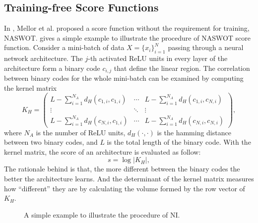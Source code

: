 \documentclass[sigconf]{acmart}
\begin{document}
    \subsection{Training-free Score Functions}
    In \cite{https://doi.org/10.48550/arxiv.2006.04647}, Mellor et al. 
    proposed a score function without the requirement for training, NASWOT. 
     gives a simple example 
    to illustrate the procedure of NASWOT score function. Consider a 
    mini-batch of data $X=\{x_i\}^N_{i=1}$ passing through a neural network 
    architecture. The $j$-th activated ReLU units in every layer of the architecture 
    form a binary code $c_{i,j}$ that define the linear region. The correlation 
    between binary codes for the whole mini-batch can be examined by computing 
    the kernel matrix 
    \begin{equation}
        K_H=\begin{pmatrix}L-\sum_{i=1}^{N_A}d_H(c_{1,i},c_{1,i})&\cdots&L-\sum_{i=1}^{N_A}d_H(c_{1,i},c_{N,i})\\\vdots&\ddots&\vdots\\L-\sum_{i=1}^{N_A}d_H(c_{N,i},c_{1,i})&\cdots&L-\sum_{i=1}^{N_A}d_H(c_{N,i},c_{N,i})\end{pmatrix},
    \end{equation}
    where $N_A$ is the number of ReLU units, $d_H(\cdot,\cdot)$ is the hamming 
    distance between two binary codes, and $L$ is the total length of the binary 
    code. With the kernel matrix, the score of an architecture is evaluated as 
    follow: 
    \begin{equation}
        s=\log\lvert K_H\rvert,
    \end{equation}
    The rationale behind is that, the more different between the binary codes 
    the better the architecture learns. And the determinant of the kernel matrix 
    measures how ``different'' they are by calculating the volume formed by the 
    row vector of $K_H$. 

    \begin{figure*}[tb]
        \vspace{-\baselineskip}
        \caption{A simple example to illustrate the procedure of NI.}
        \label{fig:ni}
        \centering
        \vspace{-\baselineskip}
    \end{figure*}
\end{document}
